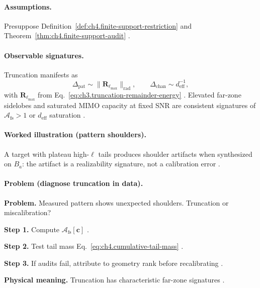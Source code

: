 \paragraph{Assumptions.}
Presuppose Definition~\ref{def:ch4.finite-support-restriction} and Theorem~\ref{thm:ch4.finite-support-audit}
\cite{stratton1941,hansen1988,harrington2001}.

\paragraph{Observable signatures.}
Truncation manifests as
\begin{equation}
\label{eq:ch4.truncation-observables}
\Delta_{\mathrm{pat}}
\sim
\|\mathbf{R}_{\ell_{\max}}\|_{\mathrm{rad}},
\qquad
\Delta_{\mathrm{chan}}
\sim
d_{\mathrm{eff}}^{-1},
\end{equation}
with \(\mathbf{R}_{\ell_{\max}}\) from Eq.~\eqref{eq:ch3.truncation-remainder-energy} \cite{hansen1988,stratton1941}. Elevated
far-zone sidelobes and saturated MIMO capacity at fixed SNR are consistent signatures of \(\mathcal{A}_{\mathrm{fs}}>1\) or
\(d_{\mathrm{eff}}\) saturation \cite{harrington2001,devaney2004}.

\paragraph{Worked illustration (pattern shoulders).}
A target with plateau high-\(\ell\) tails produces shoulder artifacts when synthesized on \(B_{a}\): the artifact is a realizability
signature, not a calibration error \cite{hansen1988,jackson1999,harrington2001}.

\paragraph{Problem (diagnose truncation in data).}
\textbf{Problem.} Measured pattern shows unexpected shoulders. Truncation or miscalibration?

\textbf{Step 1.} Compute \(\mathcal{A}_{\mathrm{fs}}[\mathbf{c}]\) \cite{hansen1988,stratton1941}.

\textbf{Step 2.} Test tail mass Eq.~\eqref{eq:ch4.cumulative-tail-mass} \cite{harrington2001}.

\textbf{Step 3.} If audits fail, attribute to geometry rank before recalibrating \cite{devaney2004}.

\textbf{Physical meaning.} Truncation has characteristic far-zone signatures \cite{hansen1988}.

